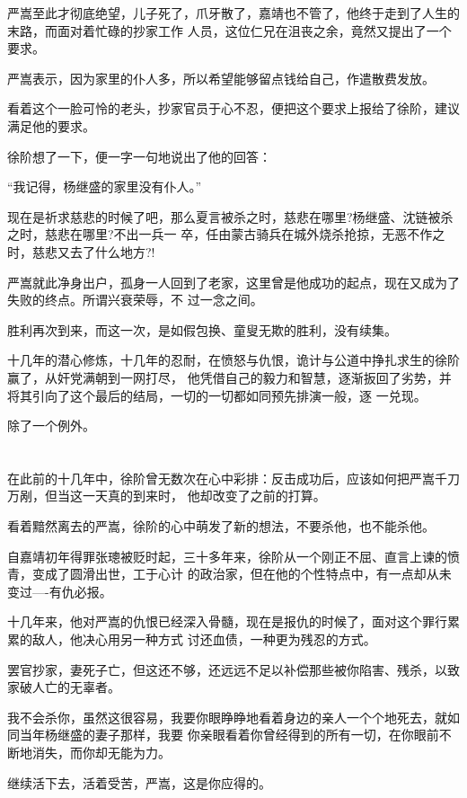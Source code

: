 \documentclass[11pt,a4paper,onecolumn]{article}
\begin{document}
严嵩至此才彻底绝望，儿子死了，爪牙散了，嘉靖也不管了，他终于走到了人生的末路，而面对着忙碌的抄家工作
人员，这位仁兄在沮丧之余，竟然又提出了一个要求。

严嵩表示，因为家里的仆人多，所以希望能够留点钱给自己，作遣散费发放。

看着这个一脸可怜的老头，抄家官员于心不忍，便把这个要求上报给了徐阶，建议满足他的要求。

徐阶想了一下，便一字一句地说出了他的回答：

``我记得，杨继盛的家里没有仆人。''

现在是祈求慈悲的时候了吧，那么夏言被杀之时，慈悲在哪里?杨继盛、沈链被杀之时，慈悲在哪里?不出一兵一
卒，任由蒙古骑兵在城外烧杀抢掠，无恶不作之时，慈悲又去了什么地方?!

严嵩就此净身出户，孤身一人回到了老家，这里曾是他成功的起点，现在又成为了失败的终点。所谓兴衰荣辱，不
过一念之间。

胜利再次到来，而这一次，是如假包换、童叟无欺的胜利，没有续集。

十几年的潜心修炼，十几年的忍耐，在愤怒与仇恨，诡计与公道中挣扎求生的徐阶赢了，从奸党满朝到一网打尽，
他凭借自己的毅力和智慧，逐渐扳回了劣势，并将其引向了这个最后的结局，一切的一切都如同预先排演一般，逐
一兑现。

除了一个例外。

\section[\thesection]{}

在此前的十几年中，徐阶曾无数次在心中彩排：反击成功后，应该如何把严嵩千刀万剐，但当这一天真的到来时，
他却改变了之前的打算。

看着黯然离去的严嵩，徐阶的心中萌发了新的想法，不要杀他，也不能杀他。

自嘉靖初年得罪张璁被贬时起，三十多年来，徐阶从一个刚正不屈、直言上谏的愤青，变成了圆滑出世，工于心计
的政治家，但在他的个性特点中，有一点却从未变过----有仇必报。

十几年来，他对严嵩的仇恨已经深入骨髓，现在是报仇的时候了，面对这个罪行累累的敌人，他决心用另一种方式
讨还血债，一种更为残忍的方式。

罢官抄家，妻死子亡，但这还不够，还远远不足以补偿那些被你陷害、残杀，以致家破人亡的无辜者。

我不会杀你，虽然这很容易，我要你眼睁睁地看着身边的亲人一个个地死去，就如同当年杨继盛的妻子那样，我要
你亲眼看着你曾经得到的所有一切，在你眼前不断地消失，而你却无能为力。

继续活下去，活着受苦，严嵩，这是你应得的。
\end{document}
